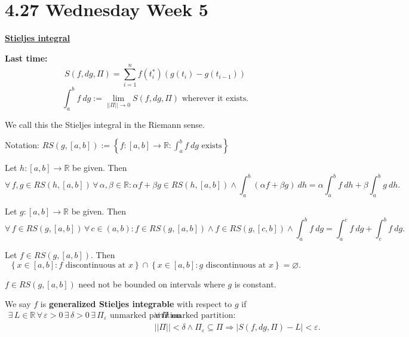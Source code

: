 \documentclass{notes}
\begin{document}
\newpage

\section{4.27 Wednesday Week 5}

{\boldmath \bfseries \underline{Stieljes integral}}

{\boldmath \bfseries Last time:} 
\[
  S(f, dg, \Pi) = \sum_{i = 1}^n f(t^*_i) (g(t_i) - g(t_{i - 1}))
\]
\[
  \int_a^b f\ dg := \lim_{||\Pi|| \to 0} S(f, dg, \Pi) \text{ wherever it exists.}
\]

We call this the Stieljes integral in the Riemann sense.

Notation: $RS(g, [a, b]) := \left \{ f \colon [a, b] \to \mathbb R : \int_a^b f\ dg \text{ exists} \right \}$ 

\begin{lem}[Linearity]
  Let $h \colon [a, b] \to \mathbb R$ be given.
  Then 
  \[
    \forall \, f, g \in RS(h, [a, b]) \, \forall \, \alpha, \beta \in \mathbb R : \alpha f + \beta g \in RS(h, [a, b]) \land \int_a^b (\alpha f + \beta g)\ dh = \alpha \int_a^b f\ dh + \beta \int_a^b g\ dh.
  \]
\end{lem}

\begin{lem}[Additivity]
  Let $g \colon [a, b] \to \mathbb R$ be given.
  Then 
  \[
    \forall \, f \in RS(g, [a, b]) \, \forall \, c \in (a, b) : f \in RS(g, [a, b]) \land f \in RS(g, [c, b]) \land \int_a^b f\ dg = \int_a^c f\ dg + \int_c^b f\ dg.
  \]
\end{lem}

\begin{lem}
  Let $f \in RS(g, [a, b])$.
  Then 
  \[
    \left \{ x \in [a, b] : \text{$f$ discontinuous at $x$} \right \} \cap \left \{ x \in [a, b] : \text{$g$ discontinuous at $x$} \right \} = \varnothing.
  \]

  \begin{note}
    $f \in RS(g, [a, b])$ need not be bounded on intervals where $g$ is constant.
  \end{note}
\end{lem}

\begin{defn}
  We say $f$ is {\boldmath \bfseries generalized Stieljes integrable} with respect to $g$ if 
  \begin{align*}
    \exists \, L \in \mathbb R \, \forall \, \varepsilon > 0 \, \exists \, \delta > 0 \, \exists \, \Pi_\varepsilon \text{ unmarked partition} \, &\forall \, \Pi \text{ marked partition} : \\ 
    &||\Pi|| < \delta \land \Pi_\varepsilon \subseteq \Pi \Rightarrow \left | S(f, dg, \Pi) - L \right | < \varepsilon.
  \end{align*}
\end{defn}
\end{document}

